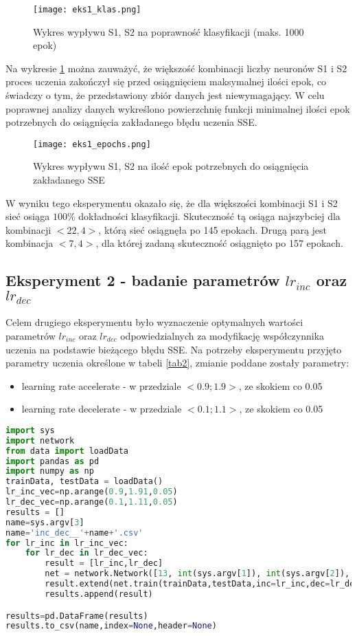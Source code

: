 \documentclass[12pt,twoside]{article}
\begin{document}
\begin{figure}[H]
\label{eks1_klas}
\centering
\texttt{[image: eks1\_klas.png]}
\caption{Wykres wypływu S1, S2 na poprawność klasyfikacji (maks. 1000 epok)}
\end{figure}

Na wykresie \ref{eks1_klas} można zauważyć, że większość kombinacji liczby neuronów S1 i S2 proces uczenia zakończył się przed osiągnięciem maksymalnej ilości epok, co świadczy o tym, że przedstawiony zbiór danych jest niewymagający. W celu poprawnej analizy danych wykreślono powierzchnię funkcji minimalnej ilości epok potrzebnych do osiągnięcia zakładanego błędu uczenia SSE.

\begin{figure}[H]
\label{eks1_epochs}
\centering
\texttt{[image: eks1\_epochs.png]}
\caption{Wykres wypływu S1, S2 na ilość epok potrzebnych do osiągnięcia zakładanego SSE}
\end{figure}

W wyniku tego eksperymentu okazało się, że dla większości kombinacji S1 i S2 sieć osiąga $100\%$ dokładności klasyfikacji. Skuteczność tą osiąga najszybciej dla kombinacji $<22,4>$, którą sieć osiągnęła po 145 epokach. Drugą parą jest kombinacja $<7,4>$, dla której zadaną skuteczność osiągnięto po 157 epokach.



\subsection{Eksperyment 2 - badanie parametrów $lr_{inc}$ oraz $lr_{dec}$}
Celem drugiego eksperymentu było wyznaczenie optymalnych wartości parametrów $lr_{inc}$ oraz $lr_{dec}$ odpowiedzialnych za modyfikację współczynnika uczenia na podstawie bieżącego błędu SSE. Na potrzeby eksperymentu przyjęto parametry uczenia określone w tabeli \ref{tab2}, zmianie poddane zostały parametry:
\begin{itemize}
\item learning rate accelerate - w przedziale $< 0.9; 1.9 >$, ze skokiem co 0.05
\item learning rate decelerate - w przedziale $< 0.1; 1.1 >$, ze skokiem co 0.05
\end{itemize}


\begin{lstlisting}[language=Python,caption=Algorytm realizujący eksperyment 2,label={eks2}]
import sys
import network
from data import loadData
import pandas as pd
import numpy as np
trainData, testData = loadData()
lr_inc_vec=np.arange(0.9,1.91,0.05)
lr_dec_vec=np.arange(0.1,1.11,0.05)
results = []
name=sys.argv[3]
name='inc_dec__'+name+'.csv'
for lr_inc in lr_inc_vec:
	for lr_dec in lr_dec_vec:
		result = [lr_inc,lr_dec]
		net = network.Network([13, int(sys.argv[1]), int(sys.argv[2]), 3])
		result.extend(net.train(trainData,testData,inc=lr_inc,dec=lr_dec))
		results.append(result)

results=pd.DataFrame(results)
results.to_csv(name,index=None,header=None)


\end{lstlisting}
\end{document}
